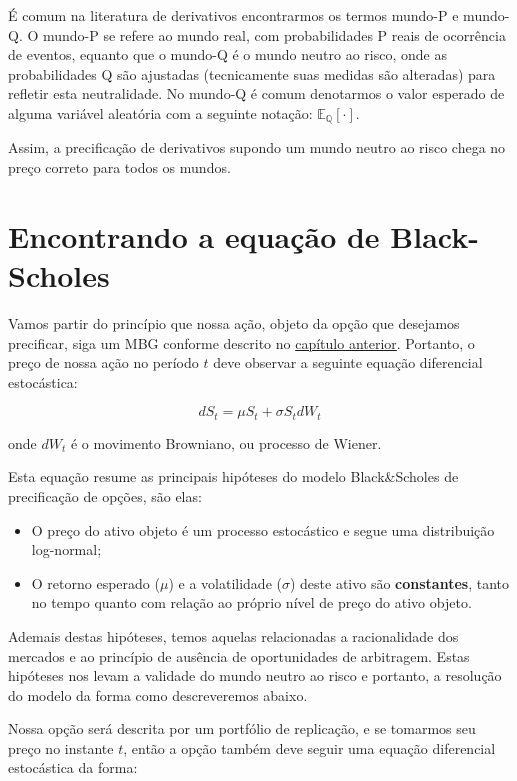 \documentclass[]{book}
\providecommand{\tightlist}{%
  \setlength{\itemsep}{0pt}\setlength{\parskip}{0pt}}
\begin{document}
É comum na literatura de derivativos encontrarmos os termos mundo-P e
mundo-Q. O mundo-P se refere ao mundo real, com probabilidades P reais
de ocorrência de eventos, equanto que o mundo-Q é o mundo neutro ao
risco, onde as probabilidades Q são ajustadas (tecnicamente suas medidas
são alteradas) para refletir esta neutralidade. No mundo-Q é comum
denotarmos o valor esperado de alguma variável aleatória com a seguinte
notação: \(\mathbb{E_Q}[\cdot]\).

Assim, a precificação de derivativos supondo um mundo neutro ao risco
chega no preço correto para todos os mundos.

\section{Encontrando a equação de
Black-Scholes}\label{encontrando-a-equacao-de-black-scholes}

Vamos partir do princípio que nossa ação, objeto da opção que desejamos
precificar, siga um MBG conforme descrito no
\protect\hyperlink{processos-estocasticos}{capítulo anterior}. Portanto,
o preço de nossa ação no período \(t\) deve observar a seguinte equação
diferencial estocástica:

\begin{equation}
dS_t=\mu S_t+\sigma S_t dW_t 
\label{eq:ds}
\end{equation}

onde \(dW_t\) é o movimento Browniano, ou processo de Wiener.

Esta equação resume as principais hipóteses do modelo Black\&Scholes de
precificação de opções, são elas:

\begin{itemize}
\tightlist
\item
  O preço do ativo objeto é um processo estocástico e segue uma
  distribuição log-normal;
\item
  O retorno esperado (\(\mu\)) e a volatilidade (\(\sigma\)) deste ativo
  são \textbf{constantes}, tanto no tempo quanto com relação ao próprio
  nível de preço do ativo objeto.
\end{itemize}

Ademais destas hipóteses, temos aquelas relacionadas a racionalidade dos
mercados e ao princípio de ausência de oportunidades de arbitragem.
Estas hipóteses nos levam a validade do mundo neutro ao risco e
portanto, a resolução do modelo da forma como descreveremos abaixo.

Nossa opção será descrita por um portfólio de replicação, e se tomarmos
seu preço no instante \(t\), então a opção também deve seguir uma
equação diferencial estocástica da forma:
\end{document}
